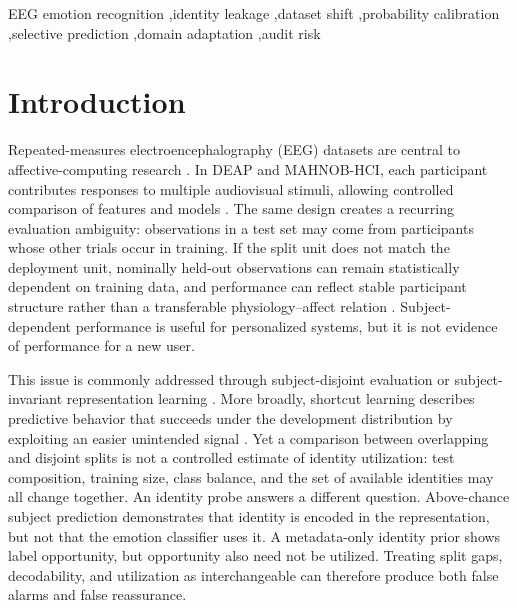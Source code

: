 \documentclass[preprint,12pt]{elsarticle}
\begin{document}
\begin{frontmatter}
\begin{keyword}
EEG emotion recognition \sep identity leakage \sep dataset shift \sep probability calibration \sep selective prediction \sep domain adaptation \sep audit risk
\end{keyword}
\end{frontmatter}

\linenumbers

\section{Introduction}
\label{sec:introduction}

Repeated-measures electroencephalography (EEG) datasets are central to affective-computing research \cite{alarcao2019survey,suhaimi2020review}. In DEAP and MAHNOB-HCI, each participant contributes responses to multiple audiovisual stimuli, allowing controlled comparison of features and models \cite{koelstra2012deap,soleymani2012mahnob}. The same design creates a recurring evaluation ambiguity: observations in a test set may come from participants whose other trials occur in training. If the split unit does not match the deployment unit, nominally held-out observations can remain statistically dependent on training data, and performance can reflect stable participant structure rather than a transferable physiology--affect relation \cite{kaufman2012leakage,roberts2017crossvalidation,saeb2017usecase,delpup2025partitioning}. Subject-dependent performance is useful for personalized systems, but it is not evidence of performance for a new user.

This issue is commonly addressed through subject-disjoint evaluation or subject-invariant representation learning \cite{rayatdoost2021subject,shen2023contrastive}. More broadly, shortcut learning describes predictive behavior that succeeds under the development distribution by exploiting an easier unintended signal \cite{geirhos2020shortcut}. Yet a comparison between overlapping and disjoint splits is not a controlled estimate of identity utilization: test composition, training size, class balance, and the set of available identities may all change together. An identity probe answers a different question. Above-chance subject prediction demonstrates that identity is encoded in the representation, but not that the emotion classifier uses it. A metadata-only identity prior shows label opportunity, but opportunity also need not be utilized. Treating split gaps, decodability, and utilization as interchangeable can therefore produce both false alarms and false reassurance.
\end{document}
